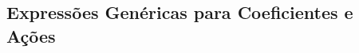 \begin{frontmatter}
	\chapter{Expressões Genéricas para Coeficientes e Ações}
\end{frontmatter}






